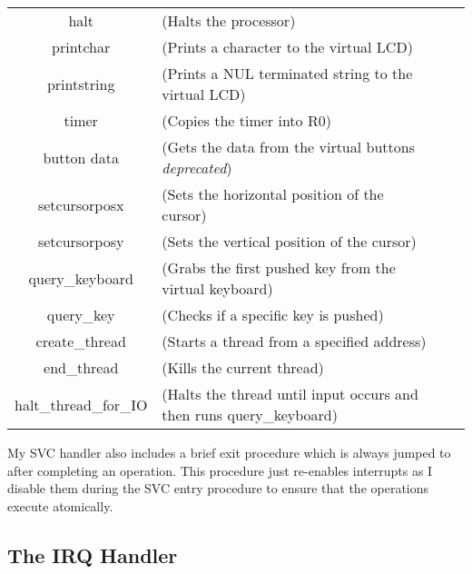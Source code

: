 \begin{tabular}{cl cl}
	halt & (Halts the processor) \\
	printchar & (Prints a character to the virtual LCD) \\
	printstring & (Prints a NUL terminated string to the virtual LCD) \\
	timer & (Copies the timer into R0) \\
	button data  & (Gets the data from the virtual buttons \textit{deprecated}) \\
	setcursorposx & (Sets the horizontal position of the cursor) \\
	setcursorposy & (Sets the vertical position of the cursor) \\
	query\_keyboard & (Grabs the first pushed key from the virtual keyboard) \\
	query\_key & (Checks if a specific key is pushed) \\
	create\_thread & (Starts a thread from a specified address) \\
	end\_thread & (Kills the current thread) \\
	halt\_thread\_for\_IO & (Halts the thread until input occurs and then runs query\_keyboard) \\
\end{tabular} 

My SVC handler also includes a brief exit procedure which is always jumped to after completing an operation. This procedure just re-enables interrupts as I disable them during the SVC entry procedure to ensure that the operations execute atomically. 
\subsection{The IRQ Handler}
